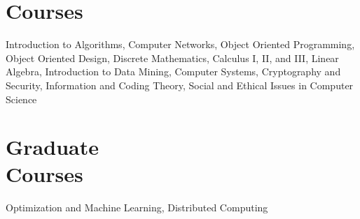 \documentclass[margin,line,a4paper]{resume}
\begin{document}
\begin{resume}
    \section{\mysidestyle Courses}
        Introduction to Algorithms, Computer Networks, Object Oriented Programming, Object Oriented Design, Discrete Mathematics, Calculus I, II, and III, Linear Algebra, Introduction to Data Mining, Computer Systems, Cryptography and Security, Information and Coding Theory, Social and Ethical Issues in Computer Science
        
    \section{\mysidestyle Graduate\\Courses}
        Optimization and Machine Learning, Distributed Computing
        
\end{resume}
\end{document}
